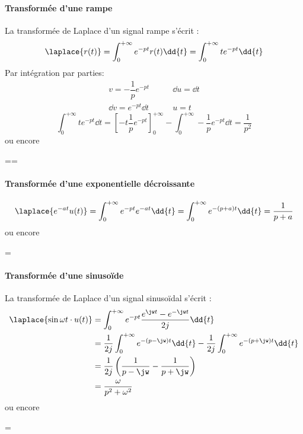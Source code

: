\paragraph{Transformée d'une rampe}
La transformée de Laplace d'un signal rampe s'écrit :
$$
\laplace{r(t)}=\int_{0}^{+\infty} e^{-pt}r(t)\dd{t}=\int_{0}^{+\infty} te^{-pt}\dd{t}
$$
Par intégration par parties:
\begin{align*}
    v=-\dfrac{1}{p}e^{-pt}\qquad&\dd{u}=\dd{t}\\
    \dd{v}=e^{-pt}\dd{t}\qquad&u=t
\end{align*}
$$
\int_{0}^{+\infty} te^{-pt}\dd{t} = \left[-t\dfrac{1}{p}e^{-pt}\right]_0^{+\infty}-\int_{0}^{+\infty} -\dfrac{1}{p}e^{-pt}\dd{t}=\dfrac{1}{p^2}
$$
ou encore
\begin{bequation}
    ==
\end{bequation}

\paragraph{Transformée d'une exponentielle décroissante}

$$
\laplace{e^{-at}u(t)}=\int_{0}^{+\infty} e^{-pt}e^{-at}\dd{t}=\int_{0}^{+\infty} e^{-(p+a)t}\dd{t} = \dfrac{1}{p+a}
$$
ou encore
\begin{bequation}
    =
\end{bequation}

\paragraph{Transformée d'une sinuso\"ide}
La transformée de Laplace d'un signal sinuso\"idal s'écrit :
\begin{align*}
\laplace{\sin{\omega t}\cdot u(t)}&=\int_{0}^{+\infty}e^{-pt}\dfrac{e^{\jw t}-e^{-\jw t}}{2j}\dd{t}\\
&=\dfrac{1}{2j}\int_{0}^{+\infty}e^{-(p-\jw)t}\dd{t} - \dfrac{1}{2j}\int_{0}^{+\infty}e^{-(p+\jw)t}\dd{t} \\
&=\dfrac{1}{2j}\left( \dfrac{1}{p-\jw}-\dfrac{1}{p+\jw}\right)\\
&=\dfrac{\omega}{p^2+\omega^2}
\end{align*}
ou encore
\begin{bequation}
    =
\end{bequation}

